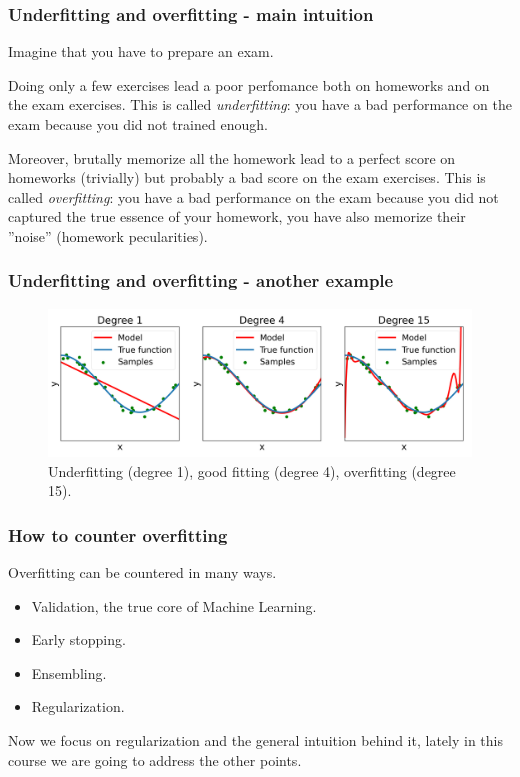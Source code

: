 \documentclass{beamer}
\begin{document}
	\begin{frame}
		\frametitle{Underfitting and overfitting - main intuition}
		
		Imagine that you have to prepare an exam. 
		
		\vspace{5mm}
		
		Doing only a few exercises lead a poor perfomance both on homeworks and on the exam exercises. This is called \textsl{underfitting}: you have a bad performance on the exam because you did not trained enough.
		
		\vspace{5mm}
		
		Moreover, brutally memorize all the homework lead to a perfect score on homeworks (trivially) but probably a bad score on the exam exercises. This is called \textsl{overfitting}: you have a bad performance on the exam because you did not captured the true essence of your homework, you have also memorize their ''noise'' (homework pecularities).
	\end{frame}

	\begin{frame}
		\frametitle{Underfitting and overfitting - another example}
		\begin{figure}
			\centering
			\includegraphics[scale=0.35]{images/overfitting_poly}
			\caption{Underfitting (degree 1), good fitting (degree 4), overfitting (degree 15).}
		\end{figure}
	\end{frame}

	\begin{frame}
		\frametitle{How to counter overfitting}
		
		Overfitting can be countered in many ways.
		
		\vspace{5mm}
		
		\begin{itemize}
			\item Validation, the true core of Machine Learning.
			\item Early stopping.
			\item Ensembling.
			\item Regularization.
		\end{itemize}
	
		\vspace{5mm}
	
		Now we focus on regularization and the general intuition behind it, lately in this course we are going to address the other points.
	\end{frame}
\end{document}
